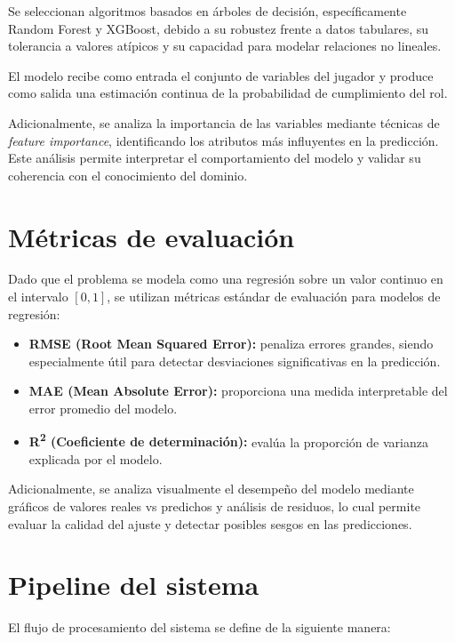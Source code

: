 \documentclass{ULBreport} %
\begin{document}
Se seleccionan algoritmos basados en árboles de decisión, específicamente Random Forest y XGBoost, debido a su robustez frente a datos tabulares, su tolerancia a valores atípicos y su capacidad para modelar relaciones no lineales.

El modelo recibe como entrada el conjunto de variables del jugador y produce como salida una estimación continua de la probabilidad de cumplimiento del rol.

Adicionalmente, se analiza la importancia de las variables mediante técnicas de \textit{feature importance}, identificando los atributos más influyentes en la predicción. Este análisis permite interpretar el comportamiento del modelo y validar su coherencia con el conocimiento del dominio.

\section{Métricas de evaluación}

Dado que el problema se modela como una regresión sobre un valor continuo en el intervalo $[0,1]$, se utilizan métricas estándar de evaluación para modelos de regresión:

\begin{itemize}
    \item \textbf{RMSE (Root Mean Squared Error):} penaliza errores grandes, siendo especialmente útil para detectar desviaciones significativas en la predicción.

    \item \textbf{MAE (Mean Absolute Error):} proporciona una medida interpretable del error promedio del modelo.

    \item \textbf{R\textsuperscript{2} (Coeficiente de determinación):} evalúa la proporción de varianza explicada por el modelo.
\end{itemize}

Adicionalmente, se analiza visualmente el desempeño del modelo mediante gráficos de valores reales vs predichos y análisis de residuos, lo cual permite evaluar la calidad del ajuste y detectar posibles sesgos en las predicciones.

\section{Pipeline del sistema}

El flujo de procesamiento del sistema se define de la siguiente manera:
\end{document}
